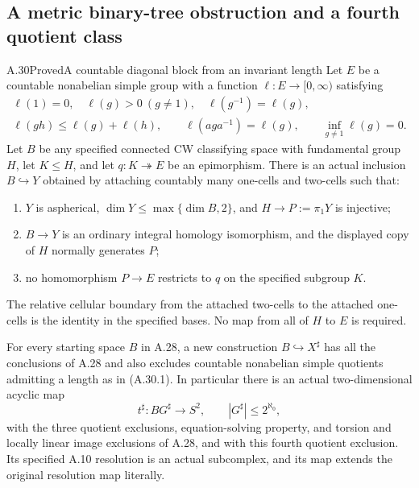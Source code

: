 \subsection{A metric binary-tree obstruction and a fourth quotient class}

\begin{claim}{A.30}{Proved}{A countable diagonal block from an invariant length}
Let $E$ be a countable nonabelian simple group with a function
$\ell:E\to[0,\infty)$ satisfying
\[
 \begin{gathered}
 \ell(1)=0,\quad \ell(g)>0\ (g\ne1),\quad
 \ell(g^{-1})=\ell(g),
 \\
 \ell(gh)\leq\ell(g)+\ell(h),\qquad
 \ell(aga^{-1})=\ell(g),\qquad
 \inf_{g\ne1}\ell(g)=0.
 \end{gathered}
 \tag{A.30.1}
\]
Let $B$ be any specified connected CW classifying space with
fundamental group $H$, let $K\leq H$, and let
$q:K\twoheadrightarrow E$ be an epimorphism.
There is an actual inclusion $B\hookrightarrow Y$ obtained by
attaching countably many one-cells and two-cells such that:
\begin{enumerate}
\item $Y$ is aspherical, $\dim Y\leq\max\{\dim B,2\}$, and
$H\to P:=\pi_1Y$ is injective;
\item $B\to Y$ is an ordinary integral homology isomorphism,
and the displayed copy of $H$ normally generates $P$;
\item no homomorphism $P\to E$ restricts to $q$ on the
specified subgroup $K$.
\end{enumerate}
The relative cellular boundary from the attached two-cells to
the attached one-cells is the identity in the specified bases.
No map from all of $H$ to $E$ is required.

For every starting space $B$ in A.28, a new construction
$B\hookrightarrow X^{\sharp}$ has all the conclusions of A.28
and also excludes countable nonabelian simple quotients admitting
a length as in (A.30.1). In particular there is an actual
two-dimensional acyclic map
\[
 t^{\sharp}:BG^{\sharp}\longrightarrow S^2,
 \qquad |G^{\sharp}|\leq 2^{\aleph_0},
 \tag{A.30.2}
\]
with the three quotient exclusions, equation-solving property,
and torsion and locally linear image exclusions of A.28, and
with this fourth quotient exclusion. Its specified A.10
resolution is an actual subcomplex, and its map extends the
original resolution map literally.
\end{claim}

